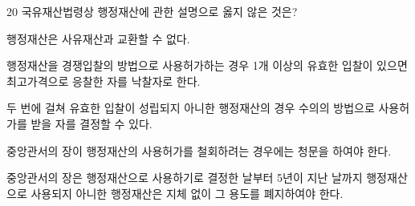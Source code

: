 \begin{question}{20}
국유재산법령상 행정재산에 관한 설명으로 옳지 않은 것은?
\begin{choices}
  \item 행정재산은 사유재산과 교환할 수 없다.
  \item 행정재산을 경쟁입찰의 방법으로 사용허가하는 경우 1개 이상의 유효한 입찰이 있으면 최고가격으로 응찰한 자를 낙찰자로 한다.
  \item 두 번에 걸쳐 유효한 입찰이 성립되지 아니한 행정재산의 경우 수의의 방법으로 사용허가를 받을 자를 결정할 수 있다.
  \item 중앙관서의 장이 행정재산의 사용허가를 철회하려는 경우에는 청문을 하여야 한다.
  \item 중앙관서의 장은 행정재산으로 사용하기로 결정한 날부터 5년이 지난 날까지 행정재산으로 사용되지 아니한 행정재산은 지체 없이 그 용도를 폐지하여야 한다.
\end{choices}
\end{question}
